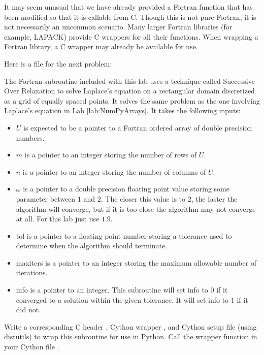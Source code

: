 \begin{info}
It may seem unusual that we have already provided a Fortran function that has been modified so that it is callable from C.
Though this is not pure Fortran, it is not necessarily an uncommon scenario.
Many larger Fortran libraries (for example, LAPACK) provide C wrappers for all their functions.
When wrapping a Fortran library, a C wrapper may already be available for use.
\end{info}

Here is a file for the next problem:


\begin{problem}
The Fortran subroutine  included with this lab uses a technique called Successive Over Relaxation to solve Laplace's equation on a rectangular domain discretized as a grid of equally spaced points.
It solves the same problem as the one involving Laplace's equation in Lab \ref{lab:NumPyArrays}.
It takes the following inputs:
\begin{itemize}
\item $U$ is expected to be a pointer to a Fortran ordered array of double precision numbers.
\item $m$ is a pointer to an integer storing the number of rows of $U$.
\item $n$ is a pointer to an integer storing the number of columns of $U$.
\item $\omega$ is a pointer to a double precision floating point value storing some parameter between $1$ and $2$.
The closer this value is to $2$, the faster the algorithm will converge, but if it is too close the algorithm may not converge at all.
For this lab just use $1.9$.
\item tol is a pointer to a floating point number storing a tolerance used to determine when the algorithm should terminate.
\item maxiters is a pointer to an integer storing the maximum allowable number of iterations.
\item info is a pointer to an integer.
This subroutine will set info to $0$ if it converged to a solution within the given tolerance.
It will set info to $1$ if it did not.
\end{itemize}

Write a corresponding C header , Cython wrapper , and Cython setup file (using distutils)  to wrap this subroutine for use in Python.
Call the wrapper function in your Cython file .


\end{problem}
